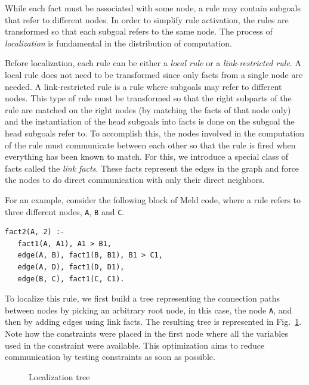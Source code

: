 \documentclass[preprint]{sigplanconf}
\begin{document}
While each fact must be associated with some node, a rule may contain subgoals that refer to
different nodes. In order to simplify rule activation, the rules are transformed so that
each subgoal refers to the same node. The process of \emph{localization} is fundamental
in the distribution of computation.

Before localization, each rule can be either a \emph{local rule} or a \emph{link-restricted rule}.
A local rule does not need to be transformed since only facts from a single node are needed.
A link-restricted rule is a rule where subgoals may refer to different nodes. This type of rule
must be transformed so that the right subparts of the rule are matched
on the right nodes (by matching the facts of that node only)
and the instantiation of the head subgoals into facts is done on the subgoal the head subgoals
refer to. To accomplish this, the nodes involved in the computation of the rule must communicate
between each other so that the rule is fired when everything has been known to match.
For this, we introduce a special class of facts called the \emph{link facts}. These facts
represent the edges in the graph and force the nodes to do direct communication with
only their direct neighbors.

For an example, consider the following block of Meld code, where a rule refers to three different
nodes, \texttt{A}, \texttt{B} and \texttt{C}.

\begin{verbatim}
fact2(A, 2) :-
   fact1(A, A1), A1 > B1,
   edge(A, B), fact1(B, B1), B1 > C1,
   edge(A, D), fact1(D, D1),
   edge(B, C), fact1(C, C1).
\end{verbatim}

To localize this rule, we first build a tree representing the connection paths between nodes by
picking an arbitrary root node, in this case, the node \texttt{A}, and then by adding
edges using link facts. The resulting tree is represented in Fig.~\ref{fig:loctree}.
Note how the constraints were placed in the first node where all the variables used in the constraint
were available. This optimization aims to reduce communication by testing constraints as soon as
possible.

\qtreecenterfalse
\begin{figure}[ht!]
\caption{Localization tree}
\label{fig:loctree}
\end{figure}
\end{document}

